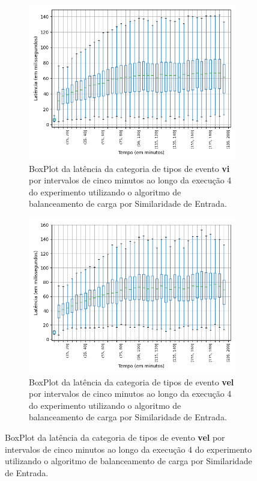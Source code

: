 \begin{figure}
\begin{subfigure}{.5\textwidth}
\centering
\includegraphics[width=\textwidth]{figuras/graphics/boxplot_9-dez-is_vi.png}
\caption{BoxPlot da latência da categoria de tipos de evento \textbf{vi} por intervalos de cinco minutos ao longo da execução 4 do experimento utilizando o algoritmo de balanceamento de carga por Similaridade de Entrada.}
\label{fig:BoxPlot_vi_IS_9-dez-is}
\end{subfigure}%
\centering
\begin{subfigure}{.5\textwidth}
\centering
\includegraphics[width=\textwidth]{figuras/graphics/boxplot_9-dez-is_vel.png}
\caption{BoxPlot da latência da categoria de tipos de evento \textbf{vel} por intervalos de cinco minutos ao longo da execução 4 do experimento utilizando o algoritmo de balanceamento de carga por Similaridade de Entrada.}
\label{fig:BoxPlot_vel_IS_9-dez-is}
\end{subfigure}%


\end{figure}

